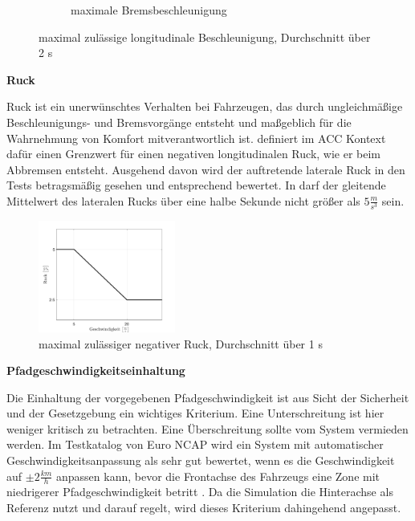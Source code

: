 \begin{figure}[H]
\begin{subfigure}[b]{.4\textwidth}
        \caption{maximale Bremsbeschleunigung}
        \label{fig:max_deceleration}
    \end{subfigure}
    \hspace*{\fill}
    \caption{maximal zulässige longitudinale Beschleunigung, Durchschnitt über 2 s \cite{ISO15622}}
    \label{fig:iso_acceleration}
\end{figure}

\bigskip\noindent\textbf{Ruck}

\noindent Ruck ist ein unerwünschtes Verhalten bei Fahrzeugen, das durch ungleichmäßige Beschleunigungs- und Bremsvorgänge entsteht und maßgeblich für die Wahrnehmung von Komfort mitverantwortlich ist. \cite{ISO15622} definiert im ACC Kontext dafür einen Grenzwert für einen negativen longitudinalen Ruck, wie er beim Abbremsen entsteht. Ausgehend davon wird der auftretende laterale Ruck in den Tests betragsmäßig gesehen und entsprechend bewertet. In \cite{UNECE_R79} darf der gleitende Mittelwert des lateralen Rucks über eine halbe Sekunde nicht größer als $5\frac{m}{s^{3}}$ sein.
\begin{figure}[ht]
    \centering
    \includegraphics[width=0.4\textwidth]{figures/3_Implementierung/max_neg_jerk.pdf}
    \caption{maximal zulässiger negativer Ruck, Durchschnitt über 1 s \cite{ISO15622}}
    \label{fig:neg_jerk}
\end{figure}

\bigskip\noindent\textbf{Pfadgeschwindigkeitseinhaltung}

\noindent Die Einhaltung der vorgegebenen Pfadgeschwindigkeit ist aus Sicht der Sicherheit und der Gesetzgebung ein wichtiges Kriterium. Eine Unterschreitung ist hier weniger kritisch zu betrachten. Eine Überschreitung sollte vom System vermieden werden. Im Testkatalog von Euro NCAP wird ein System mit automatischer Geschwindigkeitsanpassung als sehr gut bewertet, wenn es die Geschwindigkeit auf $\pm2\frac{km}{h}$ anpassen kann, bevor die Frontachse des Fahrzeugs eine Zone mit niedrigerer Pfadgeschwindigkeit betritt \cite{NCAP2024}. Da die Simulation die Hinterachse als Referenz nutzt und darauf regelt, wird dieses Kriterium dahingehend angepasst.


